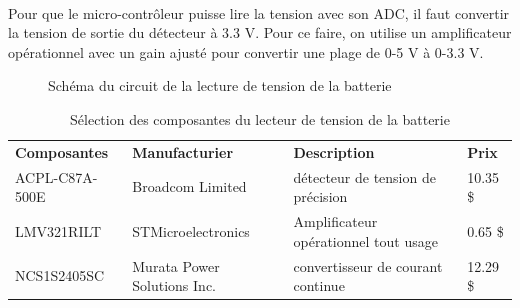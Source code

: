 	\paragraph*{}	
	Pour que le micro-contrôleur puisse lire la tension avec son ADC, il faut convertir la tension de sortie du détecteur à 3.3 V. Pour ce faire, on utilise un amplificateur opérationnel avec un gain ajusté pour convertir une plage de 0-5 V à 0-3.3 V.
	
	\begin{figure}
		\centering
		\caption{Schéma du circuit de la lecture de tension de la batterie}
		\label{fig:schemalecturetension}
	\end{figure}
	
	\begin{table}[H]
		\centering
		\caption{Sélection des composantes du lecteur de tension de la batterie}
		\label{SelectionSenseVoltageBat}
		\begin{tabular}{|p{3cm}|p{3.5cm}|p{6cm}|p{1.5cm}|}
			\hline
			\textbf{Composantes} & \textbf{Manufacturier} & \textbf{Description} & \textbf{Prix}
			\\ \hhline{|=|=|=|=|}
			ACPL-C87A-500E & Broadcom Limited & détecteur de tension de précision & 10.35 \$	\\ \hline
			LMV321RILT & STMicroelectronics & Amplificateur opérationnel tout usage & 0.65 \$	\\ \hline
			NCS1S2405SC & Murata Power Solutions Inc. & convertisseur de courant continue & 12.29 \$	\\ \hline
		\end{tabular}
	\end{table} 